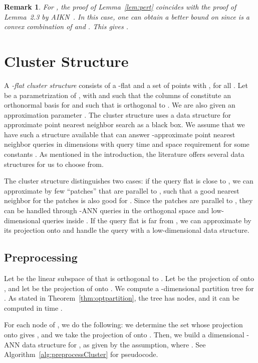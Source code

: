 \documentclass[a4paper,11pt]{paper}
\newtheorem{remark}[theorem]{Remark}
\begin{document}
\begin{remark}
  For , the proof of Lemma~\ref{lem:pert} coincides with
  the proof of Lemma~2.3 by AIKN~\cite{AndoniInKrNg09}. In this
  case, one can obtain a
  better bound on  since  is a convex combination
  of  and . This gives .
\end{remark}

\section{Cluster Structure}
\label{sec:clusterstructure}
A \emph{-flat cluster structure} consists of a -flat
 and a set  of  points with
, for all .
Let  be a parametrization of , with
 and  such that the columns
of  constitute an orthonormal basis for  and such that
 is orthogonal to .
We are also given an approximation parameter .
The cluster structure uses a data structure
for approximate point nearest neighbor search as a black box.
We assume that we have such a structure available that
can answer -approximate point nearest neighbor queries
in  dimensions with query time 
and space requirement  for
some constants . As mentioned in the
introduction, the literature offers several data structures
for us to choose from.

The cluster structure distinguishes two cases:
if the query flat  is close to , we can approximate
 by few ``patches'' that are parallel to , such that
a good nearest neighbor for the patches is also
good for . Since the patches are parallel to , they
can be handled through -ANN queries in the orthogonal
space  and low-dimensional
queries inside .
If the query flat is far from , we can approximate 
by its projection onto  and handle the query with a
low-dimensional data structure.

\subsection{Preprocessing}

Let  be the linear subspace of  that is orthogonal
to . Let  be the projection of  onto ,
and let  be the projection of  onto .
We compute a -dimensional partition
tree  for .
As stated in Theorem~\ref{thm:optpartition}, the tree 
has  nodes, and it can be computed in time .

For each node  of , we do the following:
we determine the set  whose projection onto 
gives , and we take the projection  of  onto
. Then, we build a  dimensional -ANN data
structure for , as given by the assumption,
where . See
Algorithm~\ref{alg:preprocessCluster} for pseudocode.
\end{document}
